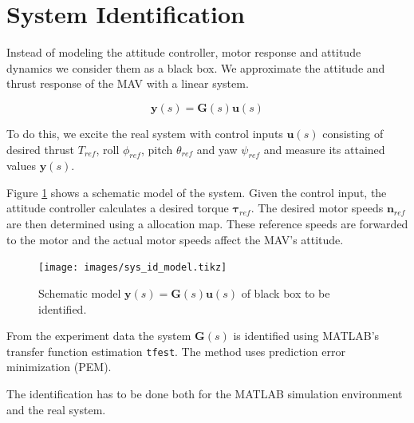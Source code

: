 
\section{System Identification}
\label{sec:sys_id}
Instead of modeling the attitude controller, motor response and attitude dynamics we consider them as a black box. We approximate the attitude and thrust response of the MAV with a linear system.

\begin{equation}
\mathbf{y}(s) = \mathbf{G}(s) \mathbf{u}(s)
\end{equation}

To do this, we excite the real system with control inputs $\mathbf{u}(s)$ consisting of desired thrust $T_{ref}$, roll $\phi_{ref}$, pitch $\theta_{ref}$ and yaw $\psi_{ref}$ and measure its attained values $\mathbf{y}(s)$.

Figure \ref{pics:sys_id_model} shows a schematic model of the system. Given the control input, the attitude controller calculates a desired torque $\boldsymbol{\tau}_{ref}$. The desired motor speeds $\mathbf{n}_{ref}$ are then determined using a allocation map. These reference speeds are forwarded to the motor and the actual motor speeds affect the MAV's attitude.

\begin{figure}
\centering
\texttt{[image: images/sys\_id\_model.tikz]}
\caption{Schematic model $\mathbf{y}(s) = \mathbf{G}(s) \mathbf{u}(s)$ of black box to be identified.}
\label{pics:sys_id_model}
\end{figure}

From the experiment data the system $\mathbf{G}(s)$ is identified using MATLAB's transfer function estimation \texttt{tfest}. The method uses prediction error minimization (PEM).

The identification has to be done both for the MATLAB simulation environment and the real system.

